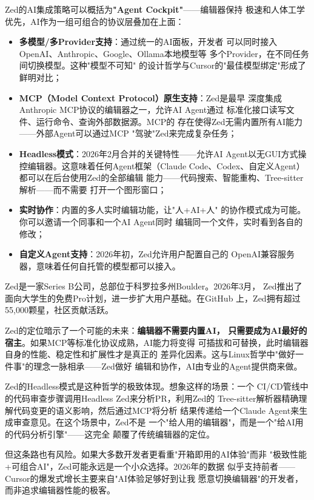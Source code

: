 Zed的AI集成策略可以概括为\textbf{"Agent Cockpit"}——编辑器保持
极速和人体工学优先，AI作为一组可组合的协议层叠加在上面：

\begin{itemize}
  \item \textbf{多模型/多Provider支持}：通过统一的AI面板，开发者
    可以同时接入OpenAI、Anthropic、Google、Ollama本地模型等
    多个Provider，在不同任务间切换模型。这种"模型不可知"
    的设计哲学与Cursor的"最佳模型绑定"形成了鲜明对比；
  \item \textbf{MCP（Model Context Protocol）原生支持}：Zed是最早
    深度集成Anthropic MCP协议的编辑器之一，允许AI Agent通过
    标准化接口读写文件、运行命令、查询外部数据源。MCP的
    存在使得Zed无需内置所有AI能力——外部Agent可以通过MCP
    "驾驶"Zed来完成复杂任务；
  \item \textbf{Headless模式}：2026年2月合并的关键特性——允许AI
    Agent以无GUI方式操控编辑器。这意味着任何Agent框架（Claude
    Code、Codex、自定义Agent）都可以在后台使用Zed的全部编辑
    能力——代码搜索、智能重构、Tree-sitter解析——而不需要
    打开一个图形窗口；
  \item \textbf{实时协作}：内置的多人实时编辑功能，让"人+AI+人"
    的协作模式成为可能。你可以邀请一个同事和一个AI Agent同时
    编辑同一个文件，实时看到各自的修改；
  \item \textbf{自定义Agent支持}：2026年初，Zed允许用户配置自己的
    OpenAI兼容服务器，意味着任何自托管的模型都可以接入。
\end{itemize}

Zed是一家Series B公司，总部位于科罗拉多州Boulder。2026年3月，
Zed推出了面向大学生的免费Pro计划，进一步扩大用户基础。在GitHub
上，Zed拥有超过55,000颗星，社区贡献活跃。

Zed的定位暗示了一个可能的未来：\textbf{编辑器不需要内置AI，
只需要成为AI最好的宿主}。如果MCP等标准化协议成熟，AI能力将变得
可插拔和可替换，此时编辑器自身的性能、稳定性和扩展性才是真正的
差异化因素。这与Linux哲学中"做好一件事"的理念一脉相承——Zed做好
编辑和协作，AI由专业的Agent提供商来做。

Zed的Headless模式是这种哲学的极致体现。想象这样的场景：一个
CI/CD管线中的代码审查步骤调用Headless Zed来分析PR，利用Zed的
Tree-sitter解析器精确理解代码变更的语义影响，然后通过MCP将分析
结果传递给一个Claude Agent来生成审查意见。在这个场景中，Zed不是
一个"给人用的编辑器"，而是一个"给AI用的代码分析引擎"——这完全
颠覆了传统编辑器的定位。

但这条路也有风险。如果大多数开发者更看重"开箱即用的AI体验"而非
"极致性能+可组合AI"，Zed可能永远是一个小众选择。2026年的数据
似乎支持前者——Cursor的爆发式增长主要来自"AI体验足够好到让我
愿意切换编辑器"的开发者，而非追求编辑器性能的极客。

